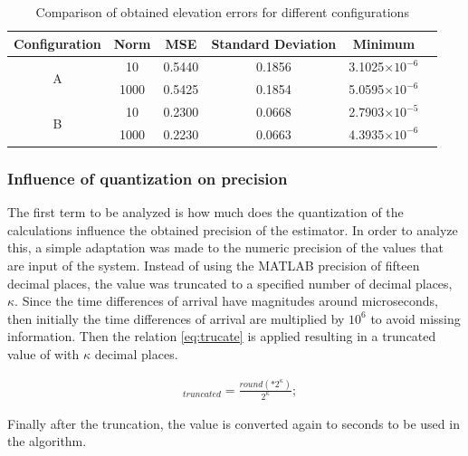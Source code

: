 \begin{table}[!htbp] %
	\begin{center}
		\begin{tabular}{ c | c c c c c }
			\toprule
			\multicolumn{1}{c|}{Configuration} & Norm & MSE & Standard Deviation & Minimum \\
			\midrule
			\multirow{2}{*}{A} &10 & 0.5440  & 0.1856 & 3.1025$\times10^{-6}$  & \\
			&1000 & 0.5425 & 0.1854 & 5.0595$\times10^{-6}$ & \\
			\midrule			
			\multirow{2}{*}{B} &10 & 0.2300 & 0.0668 & 2.7903$\times10^{-5}$ \\
			&1000 & 0.2230 & 0.0663 & 4.3935$\times10^{-6}$ \\
			\bottomrule 
		\end{tabular}
		\caption{Comparison of obtained elevation errors for different configurations}
		\label{tab:elevation-test1}
	\end{center}
\end{table}


\subsubsection{Influence of quantization on precision}

The first term to be analyzed is how much does the quantization of the calculations influence the obtained precision of the estimator. In order to analyze this, a simple adaptation was made to the numeric precision of the  values that are input of the system. Instead of using the MATLAB precision of fifteen decimal places, the value was truncated to a specified number of decimal places, $\kappa$.
Since the time differences of arrival have magnitudes around microseconds, then initially the time differences of arrival are multiplied by $10^6$ to avoid missing information. Then the relation \ref{eq:trucate} is applied resulting in a truncated value of  with $\kappa$ decimal places.

\begin{eqnarray}
&_{truncated} = \frac{round(*2^{\kappa})}{2^{\kappa}};
\label{eq:trucate}
\end{eqnarray}

Finally after the truncation, the value is converted again to seconds to be used in the algorithm.

